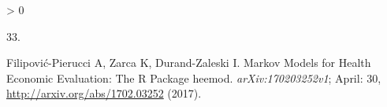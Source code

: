 \documentclass[
]{article}
\newlength{\cslhangindent}
\newlength{\csllabelwidth}
\newenvironment{CSLReferences}[2] %
 {%
  \setlength{\parindent}{0pt}
  \ifodd #1 \everypar{\setlength{\hangindent}{\cslhangindent}}\ignorespaces\fi
  \ifnum #2 > 0
  \setlength{\parskip}{#2\baselineskip}
  \fi
 }%
 {}
\newcommand{\CSLLeftMargin}[1]{\parbox[t]{\csllabelwidth}{#1}}
\newcommand{\CSLRightInline}[1]{\parbox[t]{\linewidth - \csllabelwidth}{#1}\break}
\begin{document}
\begin{CSLReferences}{0}{0}
\leavevmode\hypertarget{ref-Filipovic-Pierucci2017}{}%
\CSLLeftMargin{33. }
\CSLRightInline{Filipović-Pierucci A, Zarca K, Durand-Zaleski I. {Markov Models for Health Economic Evaluation: The R Package heemod}. \emph{arXiv:170203252v1}; April: 30, \url{http://arxiv.org/abs/1702.03252} (2017).}

\end{CSLReferences}
\end{document}
